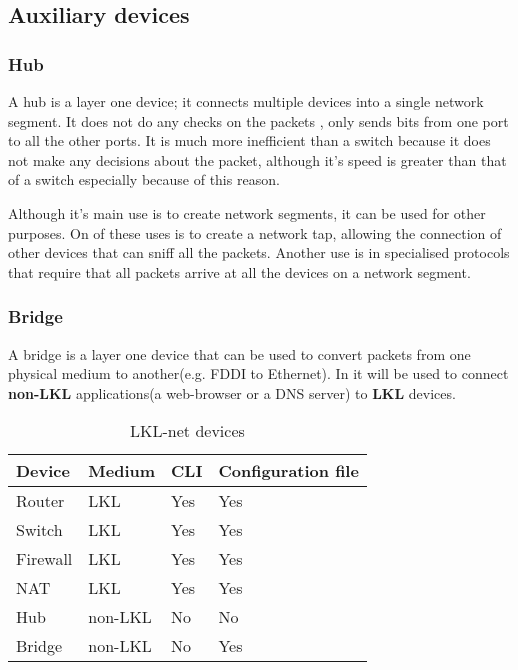\subsection{Auxiliary devices}
\label{sub-sec:auxdev}

\subsubsection{Hub}

A hub is a layer one device; it connects multiple devices into a single network segment. It does not do any checks on the packets
, only sends bits from one port to all the other ports.  It is much more inefficient than a switch 
because it does not make any decisions about the packet, although it's speed is greater than that of a switch especially because
of this reason.

Although it's main use is to create network segments, it can be used for other purposes. 
On of these uses is to create a network tap, allowing the connection of other devices 
that can sniff all the packets. Another use is in specialised protocols that require 
that all packets arrive at all the devices on a network segment.

\subsubsection{Bridge}

A bridge is a layer one device that can be used to convert packets from one physical 
medium to another(e.g. FDDI to Ethernet). In \textbf{\project} it will be used to connect 
\textbf{non-LKL} applications(a web-browser or a DNS server) to \textbf{LKL} devices.

\begin{center}
  \begin{table}[htb]
  \begin{center}
  \begin{tabular}{ | l | l | l | l |}
    \hline
      Device & Medium & CLI & Configuration file\\ \hline
      Router & LKL & Yes & Yes \\ \hline
      Switch & LKL & Yes & Yes \\ \hline
      Firewall & LKL & Yes & Yes\\ \hline
      NAT & LKL & Yes & Yes \\ \hline
      Hub & non-LKL & No & No \\ \hline
      Bridge & non-LKL & No & Yes \\ 
    \hline
  \end{tabular}
  \end{center}
  \caption{LKL-net devices}
  \label{table:tdevices}
  \end{table}
\end{center}

